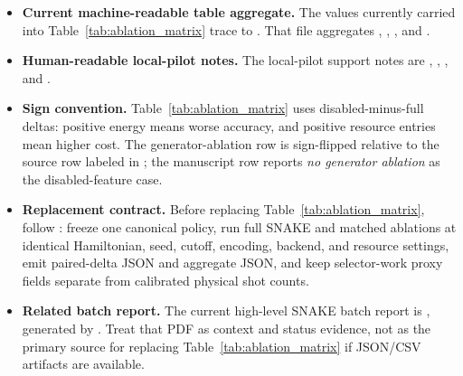 \documentclass[
  reprint,
  amsmath,
  amssymb,
  aps,
  pra,
  nofootinbib,
  superscriptaddress,
  floatfix
]{revtex4-2}
\begin{document}
\begin{itemize}
\item \textbf{Current machine-readable table aggregate.} The values currently carried into Table~\ref{tab:ablation_matrix} trace to . That file aggregates , , , and .
\item \textbf{Human-readable local-pilot notes.} The local-pilot support notes are , , , and .
\item \textbf{Sign convention.} Table~\ref{tab:ablation_matrix} uses disabled-minus-full deltas: positive energy means worse accuracy, and positive resource entries mean higher cost. The generator-ablation row is sign-flipped relative to the source row labeled  in ; the manuscript row reports \emph{no generator ablation} as the disabled-feature case.
\item \textbf{Replacement contract.} Before replacing Table~\ref{tab:ablation_matrix}, follow : freeze one canonical policy, run full SNAKE and matched ablations at identical Hamiltonian, seed, cutoff, encoding, backend, and resource settings, emit paired-delta JSON and aggregate JSON, and keep selector-work proxy fields separate from calibrated physical shot counts.
\item \textbf{Related batch report.} The current high-level SNAKE batch report is , generated by . Treat that PDF as context and status evidence, not as the primary source for replacing Table~\ref{tab:ablation_matrix} if JSON/CSV artifacts are available.
\end{itemize}

\fi
\end{document}
